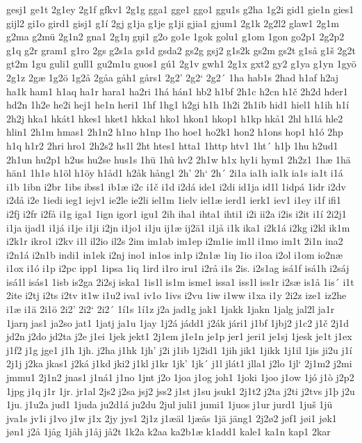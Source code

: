 gesj1
ge1t
2g1ey
2g1f
gfkv1
2g1g
gga1
gge1
ggo1
ggu1s
g2ha
1g2i
gid1
gie1n
gies1
gijl2
gi1o
gird1
gisj1
g1í
2gj
g1ja
g1je
g1ji
gjia1
gjum1
2g1k
2g2l2
glaw1
2g1m
g2ma
g2mü
2g1n2
gna1
2g1ŋ
gŋi1
g2o
go1e
1gok
golu1
g1om
1gon
go2p1
2g2p2
g1q
g2r
gram1
g1ro
2gs
g2s1a
gs1d
gsda2
gs2g
gsj2
g1s2k
gs2m
gs2t
g1så
g1š
2g2t
gt2m
1gu
guli1
gull1
gu2m1u
guos1
gú1
2g1v
gwh1
2g1x
gxt2
gy2
g1ya
g1yn
1gyö
2g1z
2gæ
1g2ö
1g2å
2gåa
gåh1
gårs1
2g2'
2g2`
2g2´
1ha
hab1s
2had
h1af
h2aj
ha1k
ham1
h1aq
ha1r
hara1
ha2ri
1há
hán1
hb2
h1bf
2h1c
h2cn
h1č
2h2d
hder1
hd2n
1h2e
he2i
hej1
he1n
heri1
1hf
1hg1
h2gi
h1h
1h2i
2h1ib
hid1
hiel1
h1ih
h1í
2h2j
hka1
hkát1
hkes1
hket1
hkka1
hko1
hkon1
hkop1
h1kp
hkå1
2hl
h1lá
hle2
hlin1
2h1m
hmas1
2h1n2
h1no
h1np
1ho
hoe1
ho2k1
hon2
h1ons
hop1
h1ó
2hp
h1q
h1r2
2hri
hro1
2h2s2
hs1l
2ht
htes1
htta1
1http
htv1
1ht´
h1þ
1hu
h2ud1
2h1un
hu2p1
h2us
hu2se
hus1s
1hü
1hû
hv2
2h1w
h1x
hy1i
hym1
2h2z1
1hæ
1hä
hän1
1h1ø
h1öl
h1öy
h1åd1
h2åk
hång1
2h'
2h`
2h´
2i1a
ia1h
ia1k
ia1s
ia1t
i1á
i1b
1ibn
i2br
1ibs
ibss1
ib1æ
i2c
i1č
i1d
i2dá
ide1
i2di
id1ja
id1l
1idpá
1idr
i2dv
i2då
i2e
1iedi
ieg1
iejv1
ie2le
ie2li
iel1m
1ielv
iel1æ
ierd1
ierk1
iev1
i1ey
i1f
ifi1
i2fj
i2fr
i2få
i1g
iga1
1ign
igor1
igu1
2ih
iha1
ihta1
ihti1
i2i
ii2a
i2is
i2it
i1í
2i2j1
i1ja
ijad1
i1já
i1je
i1ji
i2jn
i1jo1
i1ju
ij1æ
ij2ä1
i1jå
i1k
ika1
i2k1á
i2kg
i2kl
ik1m
i2k1r
ikro1
i2kv
i1l
il2io
il2s
2im
im1ab
im1ep
i2m1ie
im1l
i1mo
im1t
2i1n
ina2
i2n1á
i2n1b
indi1
in1ek
i2nj
ino1
in1os
in1p
i2n1æ
1iŋ
1io
i1oa
i2ol
i1om
io2næ
i1ox
i1ó
i1p
i2pc
ipp1
1ipsa
1iq
1ird
i1ro
iru1
i2rå
i1s
2is.
i2s1ag
isá1f
isá1h
i2sáj
isá1l
isás1
1isb
is2ga
2i2sj
iska1
1is1l
is1m
isme1
issa1
iss1l
iss1r
i2sæ
is1å
1is´
i1t
2ite
i2tj
i2ts
i2tv
it1w
i1u2
iva1
iv1o
1ivs
i2vu
1iw
i1ww
i1xa
i1y
2i2z
ize1
iz2he
i1æ
i1ä
2i1ö
2i2'
2i2`
2i2´
1í1s
1í1z
j2a
jad1g
jak1
1jakk
1jakn
1jalg
jal2l
ja1r
1jarŋ
jas1
ja2so
jat1
1jatj
ja1u
1jay
1j2á
jádd1
j2ák
jári1
j1bf
1jbj2
j1c2
j1č
2j1d
jd2n
j2do
jd2ta
j2e
j1ei
1jek
jekt1
2j1em
j1e1n
je1p
jer1
jeri1
je1sj
1jesk
je1t
j1ex
j1f2
j1g
jge1
j1h
1jh.
j2ha
j1hk
1jh'
j2i
j1ib
1j2id1
1jih
jik1
1jikk
1j1il
1jis
ji2u
j1í
2j1j
j2ka
jkas1
j2ká
j1kd
jki2
j1kl
j1kr
1jk'
1jk´
j1l
jlát1
jlla1
j2lo
1jl`
2j1m2
j2mi
jmmu1
2j1n2
jnas1
j1ná1
j1no
1jnt
j2o
1joa
j1og
joh1
1joki
1joo
j1ow
1jó
j1ò
j2p2
1jpg
j1q
j1r
1jr.
jr1al
2js2
j2sa
jsj2
jss2
j1st
j1su
jsuk1
2j1t2
j2ta
j2ti
j2tvs
j1þ
j2u
1ju.
j1u2a
jud1
1juda
ju2d1á
ju2du
2jul
juli1
jumi1
1juos
j1ur
jurd1
1juš
1jü
jva1s
jv1i
j1vo
j1w
j1x
2jy
jys1
2j1z
j1æäl
1jæäs
1jä
jäng1
2j2ø2
jøf1
jøi1
jøk1
jøn1
j2å
1jåg
1jåh
j1åj
jå2t
1k2a
k2aa
ka2b1æ
k1add1
kale1
ka1n
kap1
2kar
